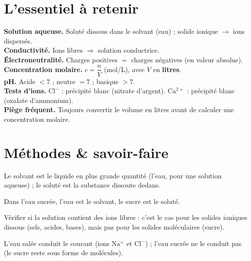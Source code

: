 \section{L'essentiel à retenir}

\begin{synthese}
\textbf{Solution aqueuse.} Soluté dissous dans le solvant (eau) ; solide ionique
$\to$ ions dispersés.\\[4pt]
\textbf{Conductivité.} Ions libres $\Rightarrow$ solution conductrice.\\[4pt]
\textbf{Électroneutralité.} Charges positives $=$ charges négatives (en valeur
absolue).\\[4pt]
\textbf{Concentration molaire.} $c=\dfrac nV$ (mol/L), avec $V$ en \textbf{litres}.\\[4pt]
\textbf{pH.} Acide $<7$ ; neutre $=7$ ; basique $>7$.\\[4pt]
\textbf{Tests d'ions.} $\mathrm{Cl^-}$ : précipité blanc (nitrate d'argent).
$\mathrm{Ca^{2+}}$ : précipité blanc (oxalate d'ammonium).\\[4pt]
\textbf{Piège fréquent.} Toujours convertir le volume en litres avant de calculer une
concentration molaire.
\end{synthese}

\section{Méthodes \& savoir-faire}

Le solvant est le liquide en plus grande quantité (l'eau, pour une solution aqueuse) ; le
soluté est la substance dissoute dedans.
\begin{exemple}
Dans l'eau sucrée, l'eau est le solvant, le sucre est le soluté.
\end{exemple}

Vérifier si la solution contient des ions libres : c'est le cas pour les solides ioniques
dissous (sels, acides, bases), mais pas pour les solides moléculaires (sucre).
\begin{exemple}
L'eau salée conduit le courant (ions $\mathrm{Na^+}$ et $\mathrm{Cl^-}$) ; l'eau sucrée ne
le conduit pas (le sucre reste sous forme de molécules).
\end{exemple}

